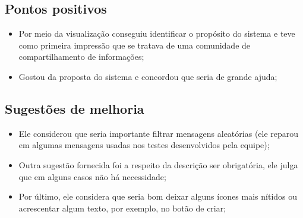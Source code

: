 \subsection{Pontos positivos}
\begin{itemize}
    \item Por meio da visualização conseguiu identificar o propósito do sistema e teve como primeira impressão que se tratava de uma comunidade de compartilhamento de informações;
    \item Gostou da proposta do sistema e concordou que seria de grande ajuda;
\end{itemize}

\subsection{Sugestões de melhoria}
\begin{itemize}
    \item Ele considerou que seria importante filtrar mensagens aleatórias (ele reparou em algumas mensagens usadas nos testes desenvolvidos pela equipe);
    \item Outra sugestão fornecida foi a respeito da descrição ser obrigatória, ele julga que em alguns casos não há necessidade; 
    \item Por último, ele considera que seria bom deixar alguns ícones mais nítidos ou acrescentar algum texto, por exemplo, no botão de criar; 
\end{itemize}
